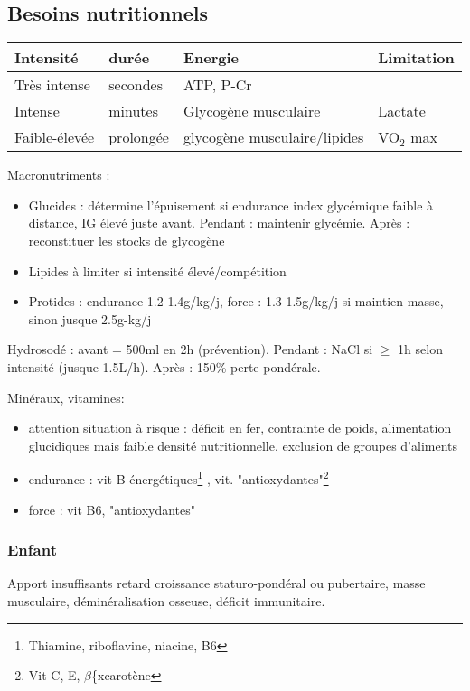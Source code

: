 \documentclass{book}
\begin{document}
\subsection{Besoins nutritionnels}
\label{sec:org2356067}

\begin{center}
\begin{tabular}{llll}
\toprule
Intensité & durée & Energie & Limitation\\
\midrule
Très intense & secondes & ATP, P-Cr & \\
Intense & minutes & Glycogène musculaire & Lactate\\
Faible-élevée & prolongée & glycogène musculaire/lipides & VO\(_{\text{2}}\) max\\
\bottomrule
\end{tabular}
\end{center}

Macronutriments :
\begin{itemize}
\item Glucides : détermine l'épuisement si endurance \thus index glycémique faible à
distance, IG élevé juste avant. Pendant : maintenir glycémie. Après :
reconstituer les stocks de glycogène
\item Lipides à limiter si intensité élevé/compétition
\item Protides : endurance 1.2-1.4g/kg/j, force : 1.3-1.5g/kg/j si maintien masse, sinon jusque 2.5g-kg/j
\end{itemize}

Hydrosodé : avant = 500ml en 2h (prévention). Pendant : NaCl si \(\ge\) 1h selon
intensité (jusque 1.5L/h). Après : 150\% perte pondérale.

Minéraux, vitamines:
\begin{itemize}
\item attention situation à risque : déficit en fer, contrainte de poids,
alimentation glucidiques mais faible densité nutritionnelle, exclusion de
groupes d'aliments
\item endurance : vit B énergétiques\footnote{Thiamine, riboflavine, niacine, B6} , vit. "antioxydantes"\footnote{Vit C, E, \(\beta\)\{xcarotène}
\item force : \inc vit B6, \inc "antioxydantes"
\end{itemize}

\subsubsection{Enfant}
\label{sec:orgc5b3b73}
Apport insuffisants \thus retard croissance staturo-pondéral ou pubertaire,
\dec masse musculaire, déminéralisation osseuse, déficit immunitaire.
\end{document}
